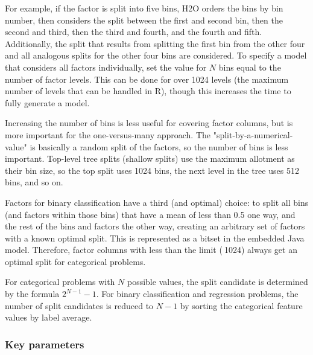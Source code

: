 \documentclass[11pt]{article}
\begin{document}
{For example, if the factor is split into five bins, H2O orders the bins by bin number, then considers the split between the first and second bin, then the second and third, then the third and fourth, and the fourth and fifth. Additionally, the split that results from splitting the first bin from the other four and all analogous splits for the other four bins are considered. To specify a model that considers all factors individually, set the value for $N$ bins equal to the number of factor levels. This can be done for over 1024 levels (the maximum number of levels that can be handled in R), though this increases the time to fully generate a model. 

Increasing the number of bins is less useful for covering factor columns, but is more important for the one-versus-many approach. The "split-by-a-numerical-value" is basically a random split of the factors, so the number of bins is less important. Top-level tree splits (shallow splits) use the maximum allotment as their bin size, so the top split uses 1024 bins, the next level in the tree uses 512 bins, and so on. 

Factors for binary classification have a third (and optimal) choice: to split all bins (and factors within those bins) that have a mean of less than 0.5 one way, and the rest of the bins and factors the other way, creating an arbitrary set of factors with a known optimal split. This is represented as a bitset in the embedded Java model. Therefore, factor columns with less than the limit ($~$1024) always get an optimal split for categorical problems. 

For categorical problems with $N$ possible values, the split candidate is determined by the formula $2^{N-1}-1$. For binary classification and regression problems, the number of split candidates is reduced to $N-1$ by sorting the categorical feature values by label average. 


\subsubsection{Key parameters}

}
\end{document}
